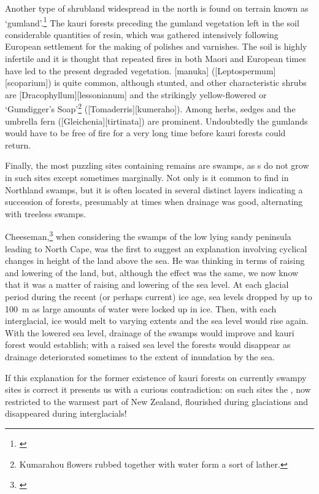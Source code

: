 Another type of shrubland widespread in the north is found on terrain known as `gumland'.\footnote{\cite{esler1975gumland}}
The kauri forests preceding the gumland vegetation left in the soil considerable quantities of resin, which was gathered intensively following European settlement for the making of polishes and varnishes.
The soil is highly infertile and it is thought that repeated fires in both Maori and European times have led to the present degraded vegetation.
[manuka] ([Leptospermum][scoparium]) is quite common, although stunted, and other characteristic shrubs are [Dracophyllum][lessonianum] and the strikingly yellow-flowered  or `Gumdigger's Soap'\footnote{Kumarahou flowers rubbed together with water form a sort of lather.} ([Tomaderris][kumeraho]).
Among herbs, sedges and the umbrella fern ([Gleichenia][tirtinata]) are prominent.
Undoubtedly the gumlands would have to be free of fire for a very long time before kauri forests could return.

Finally, the most puzzling sites containing  remains are swamps, as s do not grow in such sites except sometimes marginally.
Not only is it common to find  in Northland swamps, but it is often located in several distinct layers indicating a succession of forests, presumably at times when drainage was good, alternating with treeless swamps.

Cheeseman,\footnote{\cite{cheeseman1896flora}} when considering the swamps of the low lying sandy peninsula leading to North Cape, was the first to suggest an explanation involving cyclical changes in height of the land above the sea.
He was thinking in terms of raising and lowering of the land, but, although the effect was the same, we now know that it was a matter of raising and lowering of the sea level.
At each glacial period during the recent (or perhaps current) ice age, sea levels dropped by up to \SI{100}{\metre} as large amounts of water were locked up in ice.
Then, with each interglacial, ice would melt to varying extents and the sea level would rise again.
With the lowered sea level, drainage of the swamps would improve and kauri forest would establish; with a raised sea level the forests would disappear as drainage deteriorated sometimes to the extent of inundation by the sea.

If this explanation for the former existence of kauri forests on currently swampy sites is correct it presents us with a curious contradiction: on such sites the , now restricted to the warmest part of New Zealand, flourished during glaciations and disappeared during interglacials!

